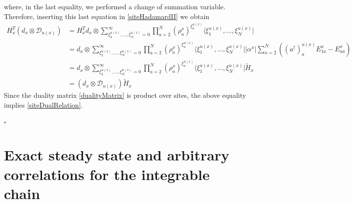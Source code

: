 \documentclass[11pt]{article}
\numberwithin{equation}{section}
\numberwithin{equation}{subsection}
\newcommand{\dd}{\mathcal{D}_{u(x)}}
\begin{document}
where, in the last equality, we performed a change of summation variable. Therefore, inserting this last equation in \eqref{siteHadamardII} we obtain 
\begin{equation}
    \begin{split}
H_{x}^{T}\left(d_{x}\otimes \dd\right)&=
     H_{x}^{T}d_{x}\otimes \sum_{\xi_{2}^{u(x)},\ldots,\xi_{N}^{u(x)}=0}^{\infty}\prod_{a=2}^{N}\left(\rho_{a}^{x}\right)^{\xi_{a}^{u(x)}}\langle \xi_{1}^{u(x)},\ldots,\xi_{N}^{u(x)}|
\\&=
d_{x}\otimes \sum_{\xi_{2}^{u(x)},\ldots,\xi_{N}^{u(x)}=0}^{\infty}\prod_{a=2}^{N}\left(\rho_{a}^{x}\right)^{\xi_{a}^{u(x)}}\langle \xi_{1}^{u(x)},\ldots,\xi_{N}^{u(x)}||\alpha^{x}|\sum_{a=2}^{N}\left((a^{\dagger})_{a}^{u(x)}E_{1a}^{x}-E_{aa}^{x}\right)   
\\&=
d_{x}\otimes \sum_{\xi_{2}^{u(x)},\ldots,\xi_{N}^{u(x)}=0}^{\infty}\prod_{a=2}^{N}\left(\rho_{a}^{x}\right)^{\xi_{a}^{u(x)}}\langle \xi_{1}^{u(x)},\ldots,\xi_{N}^{u(x)}|\widetilde{H}_{x}
\\&=
\left(d_{x}\otimes \dd\right)\widetilde{H}_{x}
    \end{split}
\end{equation}
Since the duality matrix \eqref{dualityMatrix} is product over sites, the above equality implies \eqref{siteDualRelation}. 
\begin{flushright}
$\square$
\end{flushright}









\section{Exact steady state and arbitrary correlations for the integrable chain}\label{sectionIntegrabiliy}
\end{document}
